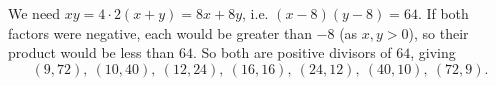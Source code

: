 We need $xy=4\cdot2(x+y)=8x+8y$, i.e. $(x-8)(y-8)=64$. If both factors were negative, each would be greater than $-8$ (as $x,y>0$), so their product would be less than $64$. So both are positive divisors of $64$, giving
\[\boxed{(9,72),\ (10,40),\ (12,24),\ (16,16),\ (24,12),\ (40,10),\ (72,9)}.\]
